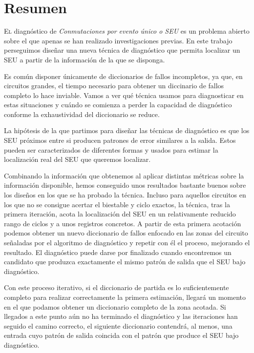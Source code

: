 \chapter*{Resumen}
\pagestyle{especial}
{}

\lettrine[lraise=-0.1, lines=2, loversize=0.2]{E}{l} diagnóstico de
\textit{Conmutaciones por evento único o \gls{SEU}} es un problema abierto sobre 
el que apenas se han realizado investigaciones previas. En este trabajo 
perseguimos diseñar una nueva técnica de diagnóstico que permita localizar un 
\gls{SEU} a partir de la información de la que se disponga.

Es común disponer únicamente de diccionarios de fallos incompletos, ya que, en
circuitos grandes, el tiempo necesario para obtener un diccinario de fallos
completo lo hace inviable. Vamos a ver qué técnica usamos para diagnosticar en
estas situaciones y cuándo se comienza a perder la capacidad de diagnóstico
conforme la exhaustividad del diccionario se reduce.

La hipótesis de la que partimos para diseñar las técnicas de diagnóstico es que
los \gls{SEU} próximos entre si producen patrones de error similares a la salida. 
Estos pueden ser caracterizados de diferentes formas y usados para estimar la
localización real del \gls{SEU} que queremos localizar.

Combinando la información que obtenemos al aplicar distintas métricas sobre la
información disponible, hemos conseguido unos resultados bastante buenos sobre los
diseños en los que se ha probado la técnica. Incluso para aquellos circuitos en
los que no se consigue acertar el biestable y ciclo exactos, la técnica, tras la
primera iteración, acota la localización del \gls{SEU} en un relativamente 
reducido rango de ciclos y a unos registros concretos. A partir de esta primera
acotación podemos obtener un nuevo diccionario de fallos enfocado en las zonas del
circuito señaladas por el algoritmo de diagnóstico y repetir con él el proceso,
mejorando el resultado. El diagnóstico puede darse por finalizado cuando
encontremos un candidato que produzca exactamente el mismo patrón de salida que
el \gls{SEU} bajo diagnóstico.

Con este proceso iterativo, si el diccionario de partida es lo suficientemente
completo para realizar correctamente la primera estimación, llegará un momento en
el que podamos obtener un diccionario completo de la zona acotada. Si llegados a
este punto aún no ha terminado el diagnóstico y las iteraciones han seguido el 
camino correcto, el siguiente diccionario contendrá, al menos, una entrada cuyo 
patrón de salida coincida con el patrón que produce el \gls{SEU} bajo diagnóstico.

